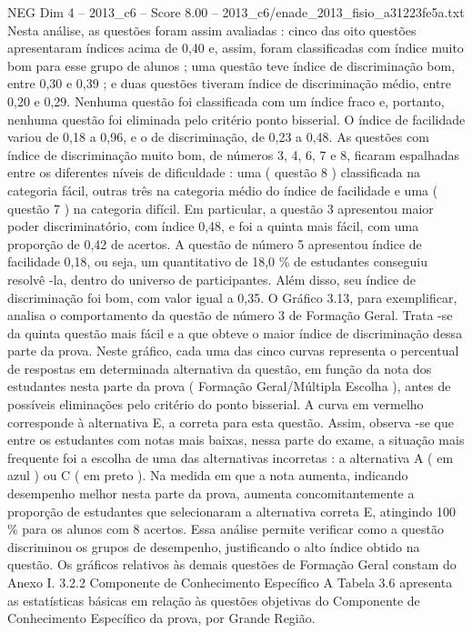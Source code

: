 \begin{textsample}{NEG Dim 4 – 2013\_c6 – Score 8.00 – 2013\_c6/enade\_2013\_fisio\_a31223fe5a.txt}
Nesta análise, as questões foram assim avaliadas : cinco das oito questões apresentaram índices acima de 0,40 e, assim, foram classificadas com índice muito bom para esse grupo de alunos ; uma questão teve índice de discriminação bom, entre 0,30 e 0,39 ; e duas questões tiveram índice de discriminação médio, entre 0,20 e 0,29.
Nenhuma questão foi classificada com um índice fraco e, portanto, nenhuma questão foi eliminada pelo critério ponto bisserial.
O índice de facilidade variou de 0,18 a 0,96, e o de discriminação, de 0,23 a 0,48.
As questões com índice de discriminação muito bom, de números 3, 4, 6, 7 e 8, ficaram espalhadas entre os diferentes níveis de dificuldade : uma ( questão 8 ) classificada na categoria fácil, outras três na categoria médio do índice de facilidade e uma ( questão 7 ) na categoria difícil.
Em particular, a questão 3 apresentou maior poder discriminatório, com índice 0,48, e foi a quinta mais fácil, com uma proporção de 0,42 de acertos.
A questão de número 5 apresentou índice de facilidade 0,18, ou seja, um quantitativo de 18,0 \% de estudantes conseguiu resolvê -la, dentro do universo de participantes.
Além disso, seu índice de discriminação foi bom, com valor igual a 0,35.
O Gráfico 3.13, para exemplificar, analisa o comportamento da questão de número 3 de Formação Geral.
Trata -se da quinta questão mais fácil e a que obteve o maior índice de discriminação dessa parte da prova.
Neste gráfico, cada uma das cinco curvas representa o percentual de respostas em determinada alternativa da questão, em função da nota dos estudantes nesta parte da prova ( Formação Geral/Múltipla Escolha ), antes de possíveis eliminações pelo critério do ponto bisserial.
A curva em vermelho corresponde à alternativa E, a correta para esta questão.
Assim, observa -se que entre os estudantes com notas mais baixas, nessa parte do exame, a situação mais frequente foi a escolha de uma das alternativas incorretas : a alternativa A ( em azul ) ou C ( em preto ).
Na medida em que a nota aumenta, indicando desempenho melhor nesta parte da prova, aumenta concomitantemente a proporção de estudantes que selecionaram a alternativa correta E, atingindo 100 \% para os alunos com 8 acertos.
Essa análise permite verificar como a questão discriminou os grupos de desempenho, justificando o alto índice obtido na questão.
Os gráficos relativos às demais questões de Formação Geral constam do Anexo I. 3.2.2 Componente de Conhecimento Específico A Tabela 3.6 apresenta as estatísticas básicas em relação às questões objetivas do Componente de Conhecimento Específico da prova, por Grande Região.

\end{textsample}
